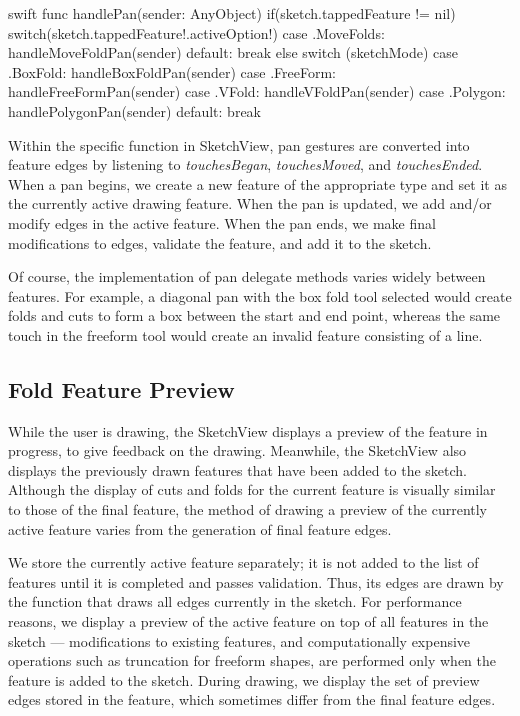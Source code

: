 \small
\singlespacing 

\begin{pygmented}{swift}
    func handlePan(sender: AnyObject) {
        if(sketch.tappedFeature != nil){
            switch(sketch.tappedFeature!.activeOption!){
            case .MoveFolds:
                handleMoveFoldPan(sender)
            default: break
            }
        }
        else{
            switch (sketchMode) {
            case .BoxFold:
                handleBoxFoldPan(sender)
            case .FreeForm:
                handleFreeFormPan(sender)
            case .VFold:
                handleVFoldPan(sender)
            case .Polygon:
                handlePolygonPan(sender)
            default:
                break
            }
        }
    }
\end{pygmented}

\doublespacing
\normalsize

Within the specific function in SketchView, pan gestures are converted
into feature edges by listening to \emph{touchesBegan},
\emph{touchesMoved}, and \emph{touchesEnded}. When a pan begins, we
create a new feature of the appropriate type and set it as the currently
active drawing feature. When the pan is updated, we add and/or modify
edges in the active feature. When the pan ends, we make final
modifications to edges, validate the feature, and add it to the sketch.

Of course, the implementation of pan delegate methods varies widely
between features. For example, a diagonal pan with the box fold tool
selected would create folds and cuts to form a box between the start and
end point, whereas the same touch in the freeform tool would create an
invalid feature consisting of a line.

\subsection{Fold Feature Preview}\label{fold-feature-preview}

While the user is drawing, the SketchView displays a preview of the
feature in progress, to give feedback on the drawing. Meanwhile, the
SketchView also displays the previously drawn features that have been
added to the sketch. Although the display of cuts and folds for the
current feature is visually similar to those of the final feature, the
method of drawing a preview of the currently active feature varies from
the generation of final feature edges.

We store the currently active feature separately; it is not added to the
list of features until it is completed and passes validation. Thus, its
edges are drawn by the function that draws all edges currently in the
sketch. For performance reasons, we display a preview of the active
feature on top of all features in the sketch --- modifications to
existing features, and computationally expensive operations such as
truncation for freeform shapes, are performed only when the feature is
added to the sketch. During drawing, we display the set of preview edges
stored in the feature, which sometimes differ from the final feature
edges.

